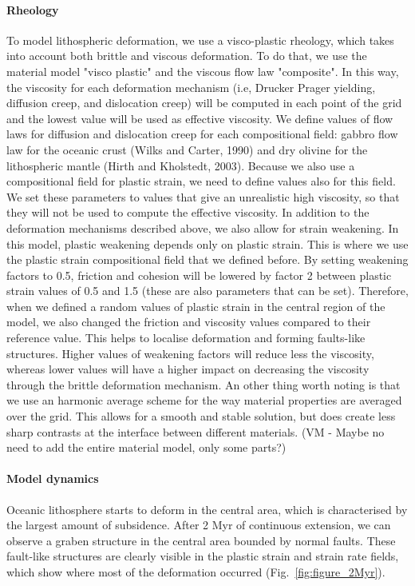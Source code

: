 \paragraph{Rheology}
To model lithospheric deformation, we use a visco-plastic rheology, which takes into account both brittle and viscous deformation. To do that, we use the material model "visco plastic" and the viscous flow law "composite". In this way, the viscosity for each deformation mechanism (i.e, Drucker Prager yielding, diffusion creep, and dislocation creep) will be computed in each point of the grid and the lowest value will be used as effective viscosity. We define values of flow laws for diffusion and dislocation creep for each compositional field: gabbro flow law for the oceanic crust (Wilks and Carter, 1990) and dry olivine for the lithospheric mantle (Hirth and Kholstedt, 2003). Because we also use a compositional field for plastic strain, we need to define values also for this field. We set these parameters to values that give an unrealistic high viscosity, so that they will not be used to compute the effective viscosity. 
In addition to the deformation mechanisms described above, we also allow for strain weakening. In this model, plastic weakening depends only on plastic strain. This is where we use the plastic strain compositional field that we defined before. By setting weakening factors to 0.5, friction and cohesion will be lowered by factor 2 between plastic strain values of 0.5 and 1.5 (these are also parameters that can be set). Therefore, when we defined a random values of plastic strain in the central region of the model, we also changed the friction and viscosity values compared to their reference value. This helps to localise deformation and forming faults-like structures. Higher values of weakening factors will reduce less the viscosity, whereas lower values will have a higher impact on decreasing the viscosity through the brittle deformation mechanism. 
An other thing worth noting is that we use an harmonic average scheme for the way material properties are averaged over the grid. This allows for a smooth and stable solution, but does create less sharp contrasts at the interface between different materials. 
(VM - Maybe no need to add the entire material model, only some parts?)



\paragraph{Model dynamics}
Oceanic lithosphere starts to deform in the central area, which is characterised by the largest amount of subsidence. After 2 Myr of continuous extension, we can observe a graben structure in the central area bounded by normal faults. These fault-like structures are clearly visible in the plastic strain and strain rate fields, which show where most of the deformation occurred (Fig.~\ref{fig:figure_2Myr}).

